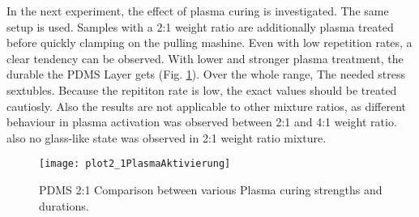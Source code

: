 In the next experiment, the effect of plasma curing is investigated. The same setup is used. Samples with a 2:1 weight ratio are additionally plasma treated before quickly clamping on the pulling mashine. Even with low repetition rates, a clear tendency can be observed. With lower and stronger plasma treatment, the durable the PDMS Layer gets (Fig. \ref{fig:PlotPlasmaAktivierung}). Over the whole range, The needed stress sextubles. Because the repititon rate is low, the exact values should be treated cautiosly. Also the results are not applicable to other mixture ratios, as different behaviour in plasma activation was observed between 2:1 and 4:1 weight ratio. also no glass-like state was observed in 2:1 weight ratio mixture.


\begin{figure}[h]
	\centering
	\texttt{[image: plot2\_1PlasmaAktivierung]}
	\caption{PDMS 2:1 Comparison between various Plasma curing strengths and durations.}
	\label{fig:PlotPlasmaAktivierung}
\end{figure}



